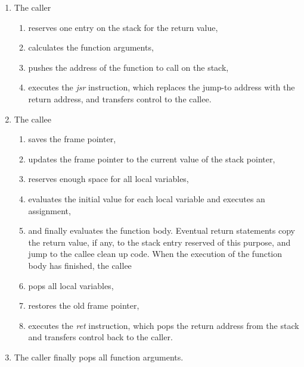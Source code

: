 \documentclass[a4paper]{article}
\begin{document}
\begin{enumerate}

  \item The caller
    \begin{enumerate}

    \item reserves one entry on the stack for the return value,

    \item calculates the function arguments,

    \item pushes the address of the function to call on the stack,

    \item executes the \emph{jsr} instruction, which replaces the jump-to
          address with the return address, and transfers control to the callee.

  \end{enumerate}
  \item The callee
    \begin{enumerate}

    \item saves the frame pointer,

    \item updates the frame pointer to the current value of the stack pointer,

    \item reserves enough space for all local variables,

    \item evaluates the initial value for each local variable and executes an
          assignment,

    \item and finally evaluates the function body. Eventual return statements
    copy the return value, if any, to the stack entry reserved of this purpose,
    and jump to the callee clean up code.  When the execution of the function
    body has finished, the callee

    \item pops all local variables,

    \item restores the old frame pointer,

    \item executes the \emph{ret} instruction, which pops the return address
    from the stack and transfers control back to the caller.

    \end{enumerate}

  \item The caller finally pops all function arguments.

\end{enumerate}
\end{document}
